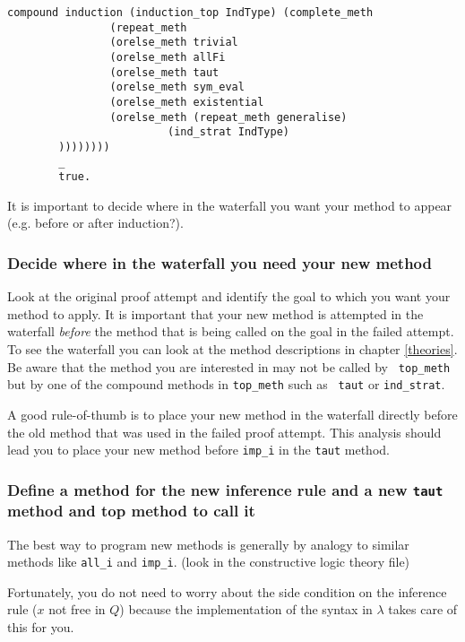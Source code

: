 \begin{verbatim}
compound induction (induction_top IndType) (complete_meth
                (repeat_meth
                (orelse_meth trivial
                (orelse_meth allFi
                (orelse_meth taut
                (orelse_meth sym_eval
                (orelse_meth existential
                (orelse_meth (repeat_meth generalise)
                         (ind_strat IndType)
        ))))))))
        _
        true.
\end{verbatim}

It is important to decide where in the waterfall you want your method
to appear (e.g. before or after induction?).  

\subsubsection*{Decide where in the waterfall you need your new method}
Look at the original proof attempt and identify the goal to which you
want your method to apply.  It is important that your new method is
attempted in the waterfall {\em before} the method that is being
called on the goal in the failed attempt.  To see the waterfall you
can look at the method descriptions in chapter \ref{theories}.  Be
aware that the method you are interested in may not be called by {\tt
  top\_meth} but by one of the compound methods in {\tt top\_meth} such as {\tt
  taut} or {\tt ind\_strat}.

A good rule-of-thumb is to place your new method in the waterfall
directly before the old method that was used in the failed proof
attempt. This analysis should lead you to place your new method before
{\tt imp\_i} in the {\tt taut} method.

\subsubsection*{Define a method for the new inference rule and 
a new {\tt taut} method and top method to call it}

The best way to program new methods is generally by analogy to similar
methods like {\tt all\_i} and {\tt imp\_i}.  (look in the constructive
logic theory file)

Fortunately, you do not need to worry about the side condition on the
inference rule ($x$ not free in $Q$) because the
implementation of the syntax in $\lambda${\clam} takes care of this
for you.

